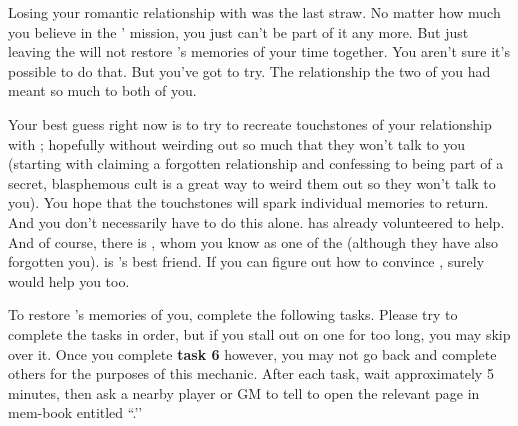 \documentclass[green]{GL2020}
\begin{document}
\name{\gRestoringLove{}}

Losing your romantic relationship with \cHeadScientist{\full} was the last straw. No matter how much you believe in the \pGoaties{}’ mission, you just can’t be part of it any more. But just leaving the \pGoaties{} will not restore \cHeadScientist{}’s memories of your time together. You aren’t sure it’s possible to do that. But you’ve got to try. The relationship the two of you had meant so much to both of you.

Your best guess right now is to try to recreate touchstones of your relationship with \cHeadScientist{}; hopefully without weirding \cHeadScientist{\them} out so much that they won’t talk to you (starting with claiming a forgotten relationship and confessing to being part of a secret, blasphemous cult is a great way to weird them out so they won’t talk to you). You hope that the touchstones will spark individual memories to return. And you don’t necessarily have to do this alone. \cInitiate{\full} has already volunteered \cInitiate{\themself} to help. And of course, there is \cChupInventor{\full}, whom you know as one of the \pGoaties{} (although they have also forgotten you). \cChupInventor{} is \cHeadScientist{}’s best friend. If you can figure out how to convince \cChupInventor{\them}, surely \cChupInventor{\they} would help you too.

To restore \cHeadScientist{}’s memories of you, complete the following tasks. Please try to complete the tasks in order, but if you stall out on one for too long, you may skip over it. Once you complete \textbf{task 6} however, you may not go back and complete others for the purposes of this mechanic. After each task, wait approximately 5 minutes, then ask a nearby player or GM to tell \cHeadScientist{} to open the relevant page in \cHeadScientist{\their} mem-book entitled ``\mIdleThoughts{}.’’
\end{document}
